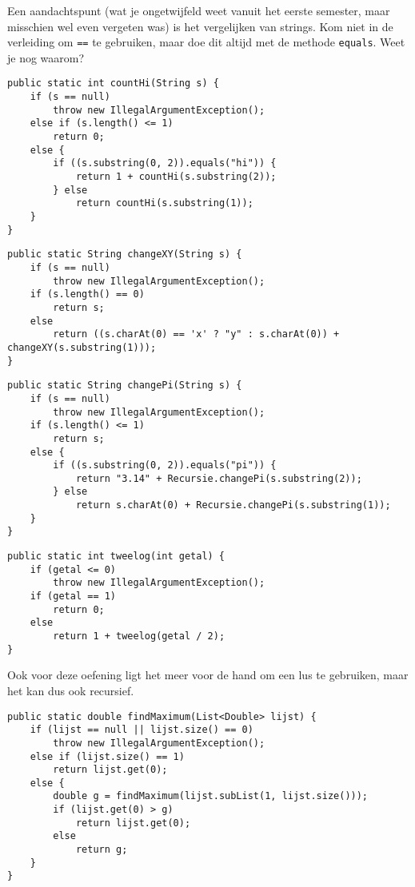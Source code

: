\begin{Oplossing}{1.5}
Een aandachtspunt (wat je ongetwijfeld weet vanuit het eerste semester, maar misschien wel even vergeten was) is het vergelijken van strings. Kom niet in de verleiding om \verb+==+ te gebruiken, maar doe dit altijd met de methode \verb+equals+. Weet je nog waarom?
\begin{lstlisting}[caption={Recursieve methode om het aantal keer te tellen dat de string hi in een string voorkomt}, label=reccounthi]
public static int countHi(String s) {
	if (s == null)
		throw new IllegalArgumentException();
	else if (s.length() <= 1)
		return 0;
	else {
		if ((s.substring(0, 2)).equals("hi")) {
			return 1 + countHi(s.substring(2));
		} else
			return countHi(s.substring(1));
	}
}
\end{lstlisting}
\end{Oplossing}
\begin{Oplossing}{1.6}
\begin{lstlisting}[caption={Vervang in een string elke letter x door een y}, label=recchangexy]
public static String changeXY(String s) {
	if (s == null)
		throw new IllegalArgumentException();
	if (s.length() == 0)
		return s;
	else
		return ((s.charAt(0) == 'x' ? "y" : s.charAt(0)) + changeXY(s.substring(1)));
}
\end{lstlisting}
\end{Oplossing}
\begin{Oplossing}{1.7}
\begin{lstlisting}[caption={Vervang in een string elke pi door een 3.14}, label=recchangepi]
public static String changePi(String s) {
	if (s == null)
		throw new IllegalArgumentException();
	if (s.length() <= 1)
		return s;
	else {
		if ((s.substring(0, 2)).equals("pi")) {
			return "3.14" + Recursie.changePi(s.substring(2));
		} else
			return s.charAt(0) + Recursie.changePi(s.substring(1));
	}
}
\end{lstlisting}
\end{Oplossing}
\begin{Oplossing}{1.8}
\begin{lstlisting}[caption={Tweelog van een macht van twee}, label=rectweelog]
public static int tweelog(int getal) {
	if (getal <= 0)
		throw new IllegalArgumentException();
	if (getal == 1)
		return 0;
	else
		return 1 + tweelog(getal / 2);
}
\end{lstlisting}
\end{Oplossing}
\begin{Oplossing}{1.9}
Ook voor deze oefening ligt het meer voor de hand om een lus te gebruiken, maar het kan dus ook recursief.
\begin{lstlisting}[caption={Maximum van een lijst getallen}, label=recfindmaximum]
public static double findMaximum(List<Double> lijst) {
	if (lijst == null || lijst.size() == 0)
		throw new IllegalArgumentException();
	else if (lijst.size() == 1)
		return lijst.get(0);
	else {
		double g = findMaximum(lijst.subList(1, lijst.size()));
		if (lijst.get(0) > g)
			return lijst.get(0);
		else
			return g;
	}
}
\end{lstlisting}
\end{Oplossing}
